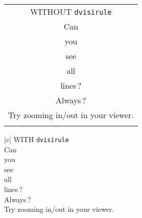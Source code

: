 \documentclass{article}
\begin{document}
\pagestyle{empty}


\newcommand{\tblA}[2]{%
  \begin{#1}{|c|}
    \noalign{\global\rownum=0}
    \showrowcolors
    \hline
    #2\\ \hhline{=}
    Can\\ \hline
    you\\ \hline
    see\\ \hline
    all\\ \hline
    lines\,?\\ \hline
    Always\,?\\ \hline
    Try zooming in\slash out in your viewer.\\ \hline
    \hiderowcolors
  \end{#1}
}

\hfill%
\tblA{tabular}{WITHOUT \texttt{dvisirule}}%
\hfill%
\tblA{sitabular}{WITH \texttt{dvisirule}}%
\hfill%
\hskip0pt
\end{document}
